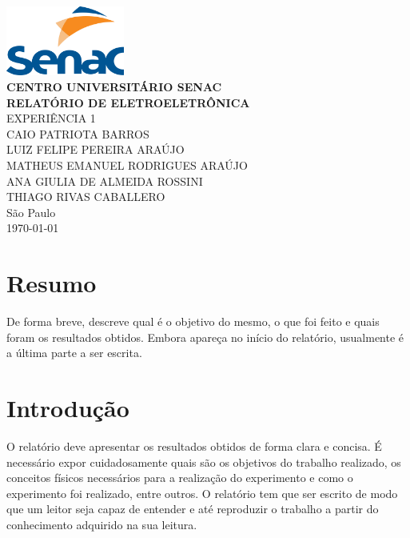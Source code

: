 \documentclass[a4paper]{article}
\begin{document}
\begin{titlepage}
    \begin{center}
        \includegraphics[width=3.9cm]{imagens/LogoSENAC.png}\\[1cm]
        \Large{\textbf{CENTRO UNIVERSITÁRIO SENAC}}\\[4cm]
        
        \LARGE{\textbf{RELATÓRIO DE ELETROELETRÔNICA}}\\[0.5cm]
        \Large{EXPERIÊNCIA 1}\\[3cm]
        
        \large
        CAIO PATRIOTA BARROS \\
        LUIZ FELIPE PEREIRA ARAÚJO \\
        MATHEUS EMANUEL RODRIGUES ARAÚJO \\
        ANA GIULIA DE ALMEIDA ROSSINI \\
        THIAGO RIVAS CABALLERO \\
        
        \vfill
        São Paulo \\
        \today
    \end{center}
\end{titlepage}

\newpage
\renewcommand{\contentsname}{Sumário}

\renewcommand{\cftsecleader}
{\cftdotfill{\cftdotsep}}

\tableofcontents
\newpage

\large

\section{Resumo}
De forma breve, descreve qual é o objetivo do mesmo, o que foi feito e quais foram os resultados obtidos. Embora apareça no início do relatório, usualmente é a última parte a ser escrita.

\section{Introdução}
O relatório deve apresentar os resultados obtidos de forma clara e concisa. É necessário expor cuidadosamente quais são os objetivos do trabalho realizado, os conceitos físicos necessários para a realização do experimento e como o experimento foi realizado, entre outros. O relatório tem que ser escrito de modo que um leitor seja capaz de entender e até reproduzir o trabalho a partir do conhecimento adquirido na sua leitura.
\end{document}
